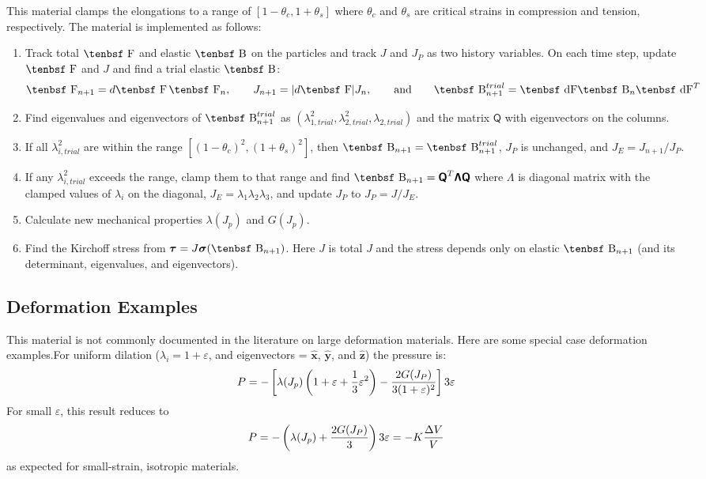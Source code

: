 \documentclass[11pt]{book}
\renewcommand{\vec}[1]{\boldsymbol{#1}}
\newcommand{\tens}[1]{\boldsymbol{\mathsf{#1}}}
\def\B{\hbox{\tenbsf B}}
\def\F{\hbox{\tenbsf F}}
\def\dF{\hbox{\tenbsf dF}}
\begin{document}
This material clamps the elongations to a range of $[1-\theta_c,1+\theta_s]$ where $\theta_c$ and $\theta_s$ are critical strains in compression and tension, respectively. The material is implemented as follows:

\begin{enumerate}

\item Track total $\F$ and elastic $\B$ on the particles and track $J$ and $J_P$ as two history variables. On each time step, update $\F$ and $J$ and find a trial elastic $\B$:
\begin{equation}
    \F_{n+1} = d\F\thinspace \F_n , \qquad J_{n+1} = |d\F| J_n  , \qquad {\rm and} \qquad  \B_{n+1}^{trial} =  \dF \B_n\dF^T
\end{equation}

\item Find eigenvalues and eigenvectors of $\B_{n+1}^{trial}$ as $(\lambda_{1,trial}^2,\lambda_{2,trial}^2,\lambda_{2,trial})$ and the matrix $\tens Q$ with eigenvectors on the columns.

\item If all $\lambda_{i,trial}^2$ are within the range $[(1-\theta_c)^2,(1+\theta_s)^2]$, then $\B_{n+1}=\B_{n+1}^{trial}$, $J_P$ is unchanged, and $J_E=J_{n+1}/J_P$.

\item If any $\lambda_{i,trial}^2$ exceeds the range, clamp them to that range and find $\B_{n+1}=\tens Q^T\tens\Lambda\tens Q$ where $\tens\Lambda$ is diagonal matrix with the clamped values of $\lambda_i$ on the diagonal, $J_E = \lambda_1\lambda_2\lambda_3$, and update $J_P$ to $J_P=J/J_E$.

\item Calculate new mechanical properties $\lambda(J_p)$ and $G(J_p)$.

\item Find the Kirchoff stress from $\tens\tau = J\tens\sigma(\B_{n+1})$. Here $J$ is total $J$ and the stress depends only on elastic $\B_{n+1}$ (and its determinant, eigenvalues, and eigenvectors).

\end{enumerate}

\subsection{Deformation Examples}

This material is not commonly documented in the literature on large deformation materials. Here are some special case deformation examples.For uniform dilation ($\lambda_i=1+\varepsilon$, and eigenvectors = $\hat{\vec x}$, $\hat{\vec y}$, and $\hat{\vec z}$) the pressure is:
\begin{eqnarray}
   P  = -\left[ \lambda(J_p)\left(1+\varepsilon+{1\over3}\varepsilon^2\right) - {2G(J_P)\over 3(1+\varepsilon)^2}\right]3 \varepsilon
\end{eqnarray}
For small $\varepsilon$, this result reduces to
\begin{eqnarray}
   P  = - \left(\lambda(J_p) + {2G(J_P)\over 3} \right) 3\varepsilon = - K {\Delta V\over V}
\end{eqnarray}
as expected for small-strain, isotropic materials.
\end{document}
